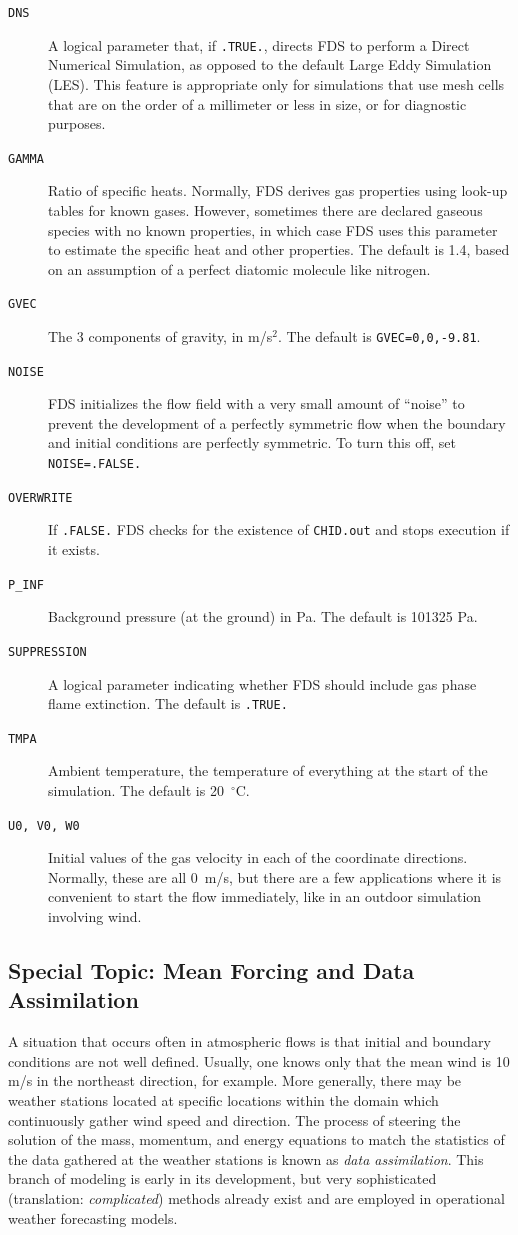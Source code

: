 \documentclass[11pt]{book}
\newcommand{\ct}{\tt\small}
\begin{document}
\begin{description}
\item[{\ct DNS}] A logical parameter that, if {\ct .TRUE.}, directs FDS to perform a Direct Numerical Simulation,
as opposed to the default Large Eddy Simulation (LES). This feature is appropriate only for simulations that use mesh cells that are
on the order of a millimeter or less in size, or for diagnostic purposes.
\item[{\ct GAMMA}] Ratio of specific heats. Normally, FDS derives gas properties using look-up tables for known gases. However, sometimes there
are declared gaseous species with no known properties, in which case FDS uses this parameter to estimate the specific heat and other properties. The default is
1.4, based on an assumption of a perfect diatomic molecule like nitrogen.
\item[{\ct GVEC}] The 3 components of gravity, in m/s$^2$. The default is {\ct GVEC=0,0,-9.81}.
\item[{\ct NOISE}] FDS initializes the flow field with a very small amount of ``noise'' to prevent the
development of a perfectly symmetric flow when the boundary
and initial conditions are perfectly symmetric. To turn this off, set {\ct NOISE=.FALSE.}
\item[{\ct OVERWRITE}] If {\ct .FALSE.} FDS checks for the existence of  {\ct CHID.out} and stops execution if it exists.
\item[{\ct P\_INF}] Background pressure (at the ground) in Pa. The default is 101325 Pa.
\item[{\ct SUPPRESSION}] A logical parameter indicating whether FDS should include gas phase flame extinction. The default is {\ct .TRUE.}
\item[{\ct TMPA}] Ambient temperature, the temperature of everything at the start of the simulation. The default is 20~$^\circ$C.
\item[{\ct U0, V0, W0}] Initial values of the gas velocity in each of the coordinate directions. Normally, these are all 0~m/s, but there are a few applications where it is
convenient to start the flow immediately, like in an outdoor simulation involving wind.
\end{description}

\subsection{Special Topic: Mean Forcing and Data Assimilation}
\label{info:mean_forcing}

A situation that occurs often in atmospheric flows is that initial and boundary conditions are not well defined.  Usually, one knows only that the mean wind is 10 m/s in the northeast direction, for example.  More generally, there may be weather stations located at specific locations within the domain which continuously gather wind speed and direction.  The process of steering the solution of the mass, momentum, and energy equations to match the statistics of the data gathered at the weather stations is known as \emph{data assimilation}.  This branch of modeling is early in its development, but very sophisticated (translation: \emph{complicated}) methods already exist \cite{Kalnay:2003} and are employed in operational weather forecasting models.
\end{document}
